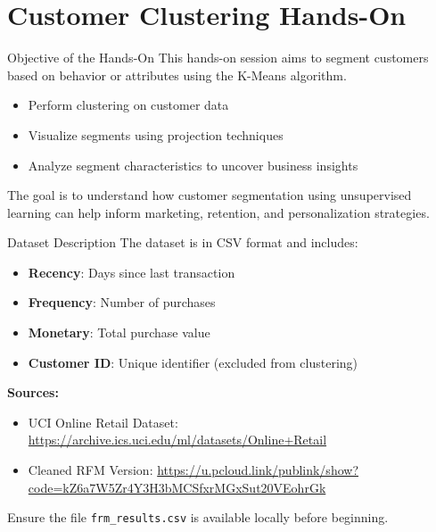 \documentclass[aspectratio=169, table]{beamer}
\begin{document}
\section{Customer Clustering Hands-On}

\begin{frame}{Objective of the Hands-On}
	This hands-on session aims to segment customers based on behavior or attributes using the K-Means algorithm.
	
	\begin{itemize}
		\item Perform clustering on customer data
		\item Visualize segments using projection techniques
		\item Analyze segment characteristics to uncover business insights
	\end{itemize}
	
	The goal is to understand how customer segmentation using unsupervised learning can help inform marketing, retention, and personalization strategies.
\end{frame}

\begin{frame}{Dataset Description}
	\vspace{20pt}
	The dataset is in CSV format and includes:
	
	\begin{itemize}
		\item \textbf{Recency}: Days since last transaction
		\item \textbf{Frequency}: Number of purchases
		\item \textbf{Monetary}: Total purchase value
		\item \textbf{Customer ID}: Unique identifier (excluded from clustering)
	\end{itemize}
	
	\textbf{Sources:}
	\begin{itemize}
		\item UCI Online Retail Dataset: \url{https://archive.ics.uci.edu/ml/datasets/Online+Retail}
		\item Cleaned RFM Version: \url{https://u.pcloud.link/publink/show?code=kZ6a7W5Zr4Y3H3bMCSfxrMGxSut20VEohrGk}
	\end{itemize}
	
	Ensure the file \texttt{frm\_results.csv} is available locally before beginning.
\end{frame}
\end{document}
